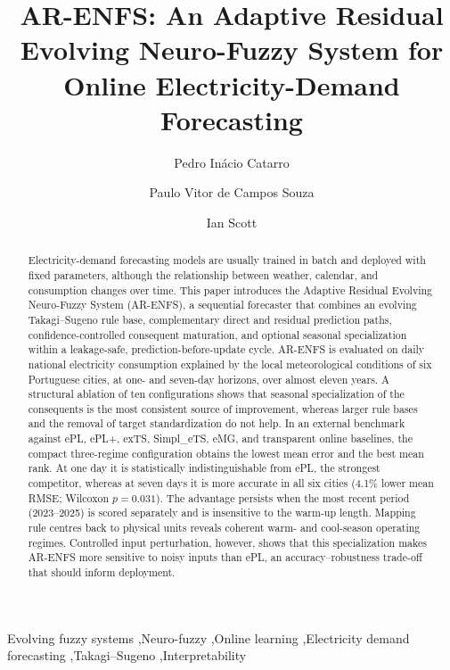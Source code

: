 \documentclass[preprint,12pt]{elsarticle}
\begin{document}
\begin{frontmatter}

\title{AR-ENFS: An Adaptive Residual Evolving Neuro-Fuzzy System for Online Electricity-Demand Forecasting}

\author[nova]{Pedro In\'acio Catarro}

\author[nova]{Paulo Vitor de Campos Souza}

\author[nova]{Ian Scott}

\address[nova]{NOVA Information Management School (NOVA IMS), Universidade NOVA de Lisboa, Campus de Campolide, 1070-312 Lisbon, Portugal}

\begin{abstract}
Electricity-demand forecasting models are usually trained in batch and deployed with fixed parameters, although the relationship between weather, calendar, and consumption changes over time. This paper introduces the Adaptive Residual Evolving Neuro-Fuzzy System (AR-ENFS), a sequential forecaster that combines an evolving Takagi--Sugeno rule base, complementary direct and residual prediction paths, confidence-controlled consequent maturation, and optional seasonal specialization within a leakage-safe, prediction-before-update cycle. AR-ENFS is evaluated on daily national electricity consumption explained by the local meteorological conditions of six Portuguese cities, at one- and seven-day horizons, over almost eleven years. A structural ablation of ten configurations shows that seasonal specialization of the consequents is the most consistent source of improvement, whereas larger rule bases and the removal of target standardization do not help. In an external benchmark against ePL, ePL+, exTS, Simpl\_eTS, eMG, and transparent online baselines, the compact three-regime configuration obtains the lowest mean error and the best mean rank. At one day it is statistically indistinguishable from ePL, the strongest competitor, whereas at seven days it is more accurate in all six cities (4.1\% lower mean RMSE; Wilcoxon $p=0.031$). The advantage persists when the most recent period (2023--2025) is scored separately and is insensitive to the warm-up length. Mapping rule centres back to physical units reveals coherent warm- and cool-season operating regimes. Controlled input perturbation, however, shows that this specialization makes AR-ENFS more sensitive to noisy inputs than ePL, an accuracy--robustness trade-off that should inform deployment.
\end{abstract}

\begin{keyword}
Evolving fuzzy systems \sep Neuro-fuzzy \sep Online learning \sep Electricity demand forecasting \sep Takagi--Sugeno \sep Interpretability
\end{keyword}

\end{frontmatter}
\end{document}

